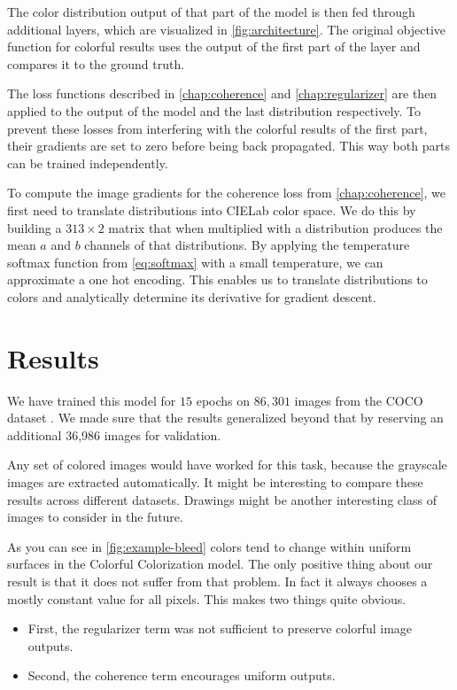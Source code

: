 \documentclass[11pt]{article}
\begin{document}
The color distribution output of that part of the model is then fed through additional layers, which are visualized in \autoref{fig:architecture}. The original objective function for colorful results uses the output of the first part of the layer and compares it to the ground truth.

The loss functions described in \autoref{chap:coherence} and \autoref{chap:regularizer} are then applied to the output of the model and the last distribution respectively. To prevent these losses from interfering with the colorful results of the first part, their gradients are set to zero before being back propagated. This way both parts can be trained independently.

To compute the image gradients for the coherence loss from \autoref{chap:coherence}, we first need to translate distributions into CIELab color space. We do this by building a $313\times2$ matrix that when multiplied with a distribution produces the mean $a$ and $b$ channels of that distributions. By applying the temperature softmax function from \autoref{eq:softmax} with a small temperature, we can approximate a one hot encoding. This enables us to translate distributions to colors and analytically determine its derivative for gradient descent.

\section{Results}

We have trained this model for $15$ epochs on $86,301$ images from the COCO dataset \cite{lin2014microsoft}. We made sure that the results generalized beyond that by reserving an additional 36,986 images for validation.

Any set of colored images would have worked for this task, because the grayscale images are extracted automatically. It might be interesting to compare these results across different datasets. Drawings might be another interesting class of images to consider in the future.

As you can see in \autoref{fig:example-bleed} colors tend to change within uniform surfaces in the Colorful Colorization model\cite{zhang2016colorful}. The only positive thing about our result is that it does not suffer from that problem. In fact it always chooses a mostly constant value for all pixels. This makes two things quite obvious.

\begin{itemize}
    \item First, the regularizer term was not sufficient to preserve colorful image outputs.
    \item Second, the coherence term encourages uniform outputs.
\end{itemize}
\end{document}
